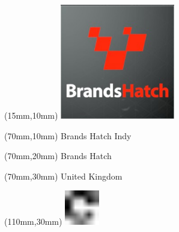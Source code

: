 \null\newpage
\begin{textblock*}{50mm}(15mm,10mm)%
\includegraphics[width=50mm]{LG/2015-05-20_00074.png}
\end{textblock*}
\begin{textblock*}{130mm}(70mm,10mm)%
{\fontsize{20}{20}\selectfont Brands Hatch Indy}\\
\end{textblock*}
\begin{textblock*}{120mm}(70mm,20mm)%
{\fontsize{16}{16}\selectfont Brands Hatch}\\
\end{textblock*}
\begin{textblock*}{120mm}(70mm,30mm)%
{\fontsize{12}{12}\selectfont United Kingdom}
\end{textblock*}
\begin{textblock*}{30mm}(110mm,30mm)%
\centering
\includegraphics[height=15mm]{icons/fa-rotate-right.pdf}
\end{textblock*}
